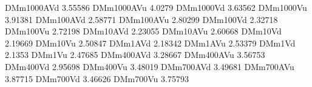 DMm1000AVd 3.55586
DMm1000AVu 4.0279
DMm1000Vd 3.63562
DMm1000Vu 3.91381
DMm100AVd 2.58771
DMm100AVu 2.80299
DMm100Vd 2.32718
DMm100Vu 2.72198
DMm10AVd 2.23055
DMm10AVu 2.60668
DMm10Vd 2.19669
DMm10Vu 2.50847
DMm1AVd 2.18342
DMm1AVu 2.53379
DMm1Vd 2.1353
DMm1Vu 2.47685
DMm400AVd 3.28667
DMm400AVu 3.56753
DMm400Vd 2.95698
DMm400Vu 3.48019
DMm700AVd 3.49681
DMm700AVu 3.87715
DMm700Vd 3.46626
DMm700Vu 3.75793
